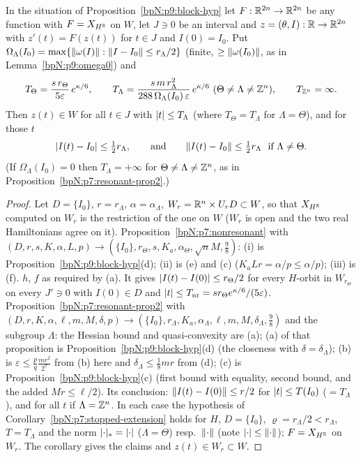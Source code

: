 \begin{lemma}\label{bpN:p9:block-stab}
In the situation of Proposition~\ref{bpN:p9:block-hyp} let $F:\mathbb{R}^{2n}\to\mathbb{R}^{2n}$ be any function with $F=X_{H^{\mathbb{R}}}$ on $W$, let $J\ni0$ be an interval and $z=(\theta,I):\mathbb{R}\to\mathbb{R}^{2n}$ with $z'(t)=F(z(t))$ for $t\in J$ and $I(0)=I_0$. Put $\Omega_\Lambda(I_0)=\max\{\lVert \omega(I)\rVert:\lVert I-I_0\rVert\le r_\Lambda/2\}$ (finite, $\ge\lVert \omega(I_0)\rVert$, as in Lemma~\ref{bpN:p9:omega0}) and
\[T_\Theta=\frac{s\,r_\Theta}{5\varepsilon}\,e^{\kappa/6},\qquad T_\Lambda=\frac{s\,m\,r_\Lambda^2}{288\,\Omega_\Lambda(I_0)\,\varepsilon}\,e^{\kappa/6}\ (\Theta\ne\Lambda\ne\Z^n),\qquad T_{\Z^n}=\infty.\]
Then $z(t)\in W$ for all $t\in J$ with $\lvert t\rvert\le T_\Lambda$ (where $T_\Theta=T_\Lambda$ for $\Lambda=\Theta$), and for those $t$
\[\abs{I(t)-I_0}\le\tfrac12r_\Lambda,\qquad\text{and}\qquad\norm{I(t)-I_0}\le\tfrac12r_\Lambda\ \text{ if }\Lambda\ne\Theta.\]
(If $\Omega_\Lambda(I_0)=0$ then $T_\Lambda=+\infty$ for $\Theta\ne\Lambda\ne\mathbb{Z}^n$, as in Proposition~\ref{bpN:p7:resonant-prop2}.)
\end{lemma}
\begin{proof}
Let $D=\{I_0\}$, $r=r_\Lambda$, $\alpha=\alpha_\Lambda$, $W_r=\mathbb{R}^n\times U_{r}D\subset W$, so that $X_{H^{\mathbb{R}}}$ computed on $W_r$ is the restriction of the one on $W$ ($W_r$ is open and the two real Hamiltonians agree on it).
\label{stepN:p9:bs-theta} Proposition~\ref{bpN:p7:nonresonant} with $(D,r,s,K,\alpha,L,p)\to(\{I_0\},r_\Theta,s,K_a,\alpha_\Theta,\sqrt nM,\frac98)$: (i) is Proposition~\ref{bpN:p9:block-hyp}(d); (ii) is (e) and (c) ($K_aLr=\alpha/p\le\alpha/p$); (iii) is (f). $h$, $f$ as required by (a). It gives $\lvert I(t)-I(0)\rvert\le r_\Theta/2$ for every $H$-orbit in $W_{r_\Theta}$ on every $J'\ni0$ with $I(0)\in D$ and $\lvert t\rvert\le T_{\mathrm{nr}}=sr_\Theta e^{\kappa/6}/(5\varepsilon)$.
\label{stepN:p9:bs-res} Proposition~\ref{bpN:p7:resonant-prop2} with $(D,r,K,\alpha,\ell,m,M,\delta,p)\to(\{I_0\},r_\Lambda,K_a,\alpha_\Lambda,\ell,m,M,\delta_\Lambda,\frac98)$ and the subgroup $\Lambda$: the Hessian bound and quasi-convexity are (a); (a) of that proposition is Proposition~\ref{bpN:p9:block-hyp}(d) (the closeness with $\delta=\delta_\Lambda$); (b) is $\varepsilon\le\frac pq\frac{mr^2}{2^7}$ from (b) here and $\delta_\Lambda\le\frac18mr$ from (d); (c) is Proposition~\ref{bpN:p9:block-hyp}(c) (first bound with equality, second bound, and the added $Mr\le\ell/2$). Its conclusion: $\lVert I(t)-I(0)\rVert\le r/2$ for $\lvert t\rvert\le T(I_0)$ ($=T_\Lambda$), and for all $t$ if $\Lambda=\mathbb{Z}^n$.
\label{stepN:p9:bs-stop} In each case the hypothesis of Corollary~\ref{bpN:p7:stopped-extension} holds for $H$, $D=\{I_0\}$, $\varrho=r_\Lambda/2<r_\Lambda$, $T=T_\Lambda$ and the norm $\lvert \cdot\rvert_*=\lvert \cdot\rvert$ ($\Lambda=\Theta$) resp.\ $\lVert \cdot\rVert$ (note $\lvert \cdot\rvert\le\lVert \cdot\rVert$); $F=X_{H^{\mathbb{R}}}$ on $W_r$. The corollary gives the claims and $z(t)\in W_r\subset W$.
\end{proof}

